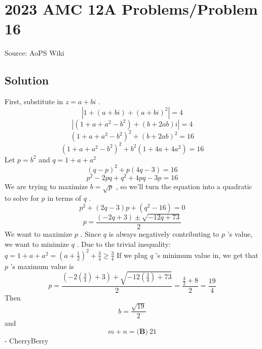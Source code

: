 \documentclass[12pt]{article}
\begin{document}
\section*{{2023 AMC 12A Problems/Problem 16}}
Source: AoPS Wiki

\subsection*{Solution}
First, substitute in $z=a+bi$ . \[|1+(a+bi)+(a+bi)^2|=4\] \[|(1+a+a^2-b^2)+ (b+2ab)i|=4\] \[(1+a+a^2-b^2)^2+ (b+2ab)^2=16\] \[(1+a+a^2-b^2)^2+ b^2(1+4a+4a^2)=16\] Let $p=b^2$ and $q=1+a+a^2$ \[(q-p)^2+ p(4q-3)=16\] \[p^2-2pq+q^2 + 4pq -3p=16\] We are trying to maximize $b=\sqrt p$ , so we'll turn the equation into a quadratic to solve for $p$ in terms of $q$ . \[p^2+(2q-3)p+(q^2-16)=0\] \[p=\frac{(-2q+3)\pm \sqrt{-12q+73}}{2}\] We want to maximize $p$ . Since $q$ is always negatively contributing to $p$ 's value, we want to minimize $q$ . Due to the trivial inequality: $q=1+a+a^2=(a+\frac 12)^2+\frac{3}4 \geq \frac{3}4$ If we plug $q$ 's minimum value in, we get that $p$ 's maximum value is \[p=\frac{(-2(\frac 34)+3)+ \sqrt{-12(\frac 34)+73}}{2}=\frac{\frac 32+ 8}{2}=\frac{19}{4}\] Then \[b=\frac{\sqrt{19}}{2}\] and \[m+n=\boxed{\textbf{(B)}~21}\] - CherryBerry
\end{document}
